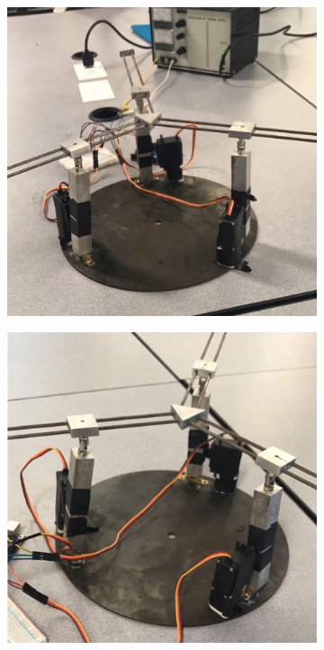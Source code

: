 \documentclass[titlepage, letterpaper]{article}
\begin{document}
\begin{figure}[htbp]
    \centering
    \begin{subfigure}[b]{0.4\textwidth}
        \includegraphics[width=\linewidth]{photo01}
    \end{subfigure}
    \begin{subfigure}[b]{0.4\textwidth}
        \includegraphics[width=\linewidth]{photo02}

\end{subfigure}
\end{figure}
\end{document}

